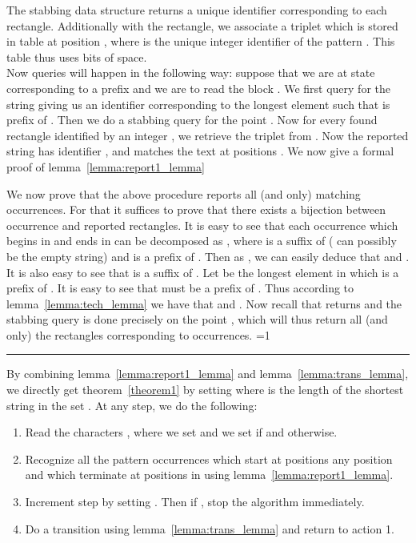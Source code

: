 \documentclass{article}
\newcommand{\?}{\mskip1.5mu}
\newcounter{noqed}
\newcommand{\qed}{ \ifmmode\mbox{
}\fi\rule[-.05em]{.3em}{.7em}\setcounter{noqed}{0}}
\newenvironment{proof}[1][{}]{\noindent{\bf Proof#1.
}\setcounter{noqed}{1}}{\ifnum\value{noqed}=1\qed\fi\par\medskip}
\begin{document}
The  stabbing data structure returns a unique identifier  corresponding to each rectangle. Additionally with the rectangle, we associate a triplet  which is stored in table  at position , where  is the unique integer identifier of the pattern . This table thus uses  bits of space.
\\Now queries will happen in the following way: suppose that we are at state  corresponding to a prefix  and we are to read the block . We first query  for the string  giving us an identifier  corresponding to the longest element  such that  is prefix of . Then we do a  stabbing query for the point . Now for every found rectangle identified by an integer , we retrieve the triplet  from . Now the reported string has identifier , and matches the text at positions .  
We now give a formal proof of lemma~\ref{lemma:report1_lemma}

\begin{proof}
We now prove that the above procedure reports all (and only) matching occurrences. For that it suffices to prove that there exists a bijection between occurrence and reported rectangles. It is easy to see that each occurrence  which begins in  and ends in  can be decomposed as , where  is a suffix of  ( can possibly be the empty string) and  is a prefix of . Then as , we can easily deduce that  and . It is also easy to see that  is a suffix of . Let  be the longest element in  which is a prefix of . It is easy to see that  must be a prefix of . Thus according to lemma~\ref{lemma:tech_lemma} we have that  and . Now recall that  returns  and the  stabbing query is done precisely on the point , which will thus return all (and only) the rectangles corresponding to occurrences. 
\end{proof}
By combining lemma~\ref{lemma:report1_lemma} and lemma~\ref{lemma:trans_lemma}, we directly get theorem~\ref{theorem1} by setting  where  is the length of the shortest string in the set . At any step, we do the following: 
\begin{enumerate}
\item Read the characters , where we set  and we set  if  and  otherwise. 
\item Recognize all the pattern occurrences which start at positions any position  and which terminate at positions in  using lemma~\ref{lemma:report1_lemma}. 
\item Increment step  by setting . Then if , stop the algorithm immediately. 
\item Do a transition using lemma~\ref{lemma:trans_lemma} and return to action 1. 
\end{enumerate}
\end{document}
